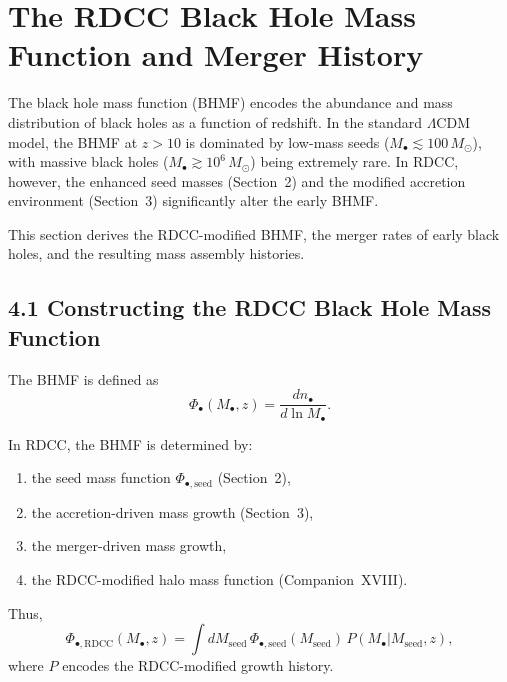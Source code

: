 \documentclass[11pt,a4paper]{article}
\begin{document}
\section{The RDCC Black Hole Mass Function and Merger History}

The black hole mass function (BHMF) encodes the abundance and mass distribution of black holes 
as a function of redshift. In the standard $\Lambda$CDM model, the BHMF at $z > 10$ is 
dominated by low-mass seeds ($M_{\bullet} \lesssim 100\,M_{\odot}$), with massive black holes 
($M_{\bullet} \gtrsim 10^{6}\,M_{\odot}$) being extremely rare. In RDCC, however, the enhanced 
seed masses (Section~2) and the modified accretion environment (Section~3) significantly alter 
the early BHMF.

This section derives the RDCC-modified BHMF, the merger rates of early black holes, and the 
resulting mass assembly histories.

\subsection*{4.1 Constructing the RDCC Black Hole Mass Function}

The BHMF is defined as
\begin{equation}
    \Phi_{\bullet}(M_{\bullet},z)
    = \frac{dn_{\bullet}}{d\ln M_{\bullet}}.
\end{equation}

In RDCC, the BHMF is determined by:

\begin{enumerate}
    \item the seed mass function $\Phi_{\bullet,\mathrm{seed}}$ (Section~2),
    \item the accretion-driven mass growth (Section~3),
    \item the merger-driven mass growth,
    \item the RDCC-modified halo mass function (Companion~XVIII).
\end{enumerate}

Thus,
\begin{equation}
    \Phi_{\bullet,\mathrm{RDCC}}(M_{\bullet},z)
    = \int dM_{\mathrm{seed}}\,
      \Phi_{\bullet,\mathrm{seed}}(M_{\mathrm{seed}})\,
      P(M_{\bullet}|M_{\mathrm{seed}},z),
\end{equation}
where $P$ encodes the RDCC-modified growth history.

\end{document}
